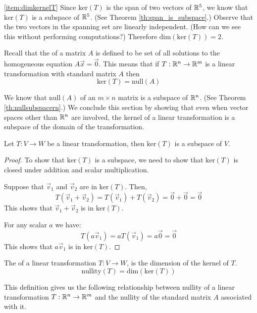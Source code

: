 \documentclass{ximera}
\begin{document}
\begin{example}
\begin{explanation}
\ref{item:dimkernelT}  Since $\mbox{ker}(T)$ is the span of two vectors of $\mathbb{R}^5$, we know that $\mbox{ker}(T)$ is a subspace of $\mathbb{R}^5$. (See Theorem \ref{th:span_is_subspace}.)  Observe that the two vectors in the spanning set are linearly independent. (How can we see this without performing computations?)  Therefore $\mbox{dim}(\mbox{ker}(T))=2$.
\end{explanation}
\end{example}
 
 
Recall that the  of a matrix $A$ is defined to be set of all solutions to the homogeneous equation $A\vec{x}=\vec{0}$. This means that  if $T:\mathbb{R}^n\rightarrow \mathbb{R}^m$ is a linear transformation with standard matrix $A$ then
$$\mbox{ker}(T)=\mbox{null}(A)$$
 
We know that $\mbox{null}(A)$ of an $m\times n$ matrix is a subspace of $\mathbb{R}^n$. (See Theorem \ref{th:nullsubspacern}.)  We conclude this section by showing that even when vector spaces other than $\mathbb{R}^n$ are involved, the kernel of a linear transformation is a subspace of the domain of the transformation.
\begin{theorem}\label{th:kersubspace} Let $T:V\rightarrow W$ be a linear transformation, then $\mbox{ker}(T)$ is a subspace of $V$.
\end{theorem}
\begin{proof}
To show that $\mbox{ker}(T)$ is a subspace, we need to show that $\mbox{ker}(T)$ is closed under addition and scalar multiplication.
 
Suppose that $\vec{v}_1$ and $\vec{v}_2$ are in $\mbox{ker}(T)$.  Then,
$$T(\vec{v}_1+\vec{v}_2)=T(\vec{v}_1)+T(\vec{v}_2)=\vec{0}+\vec{0}=\vec{0}$$
This shows that $\vec{v}_1+\vec{v}_2$ is in $\mbox{ker}(T)$.
 
For any scalar $a$ we have:
$$T(a\vec{v}_1)=aT(\vec{v}_1)=a\vec{0}=\vec{0}$$
This shows that $a\vec{v}_1$ is in $\mbox{ker}(T)$.
 
\end{proof}
 
 
 
\begin{definition}\label{def:nullityT}
The  of a linear transformation $T:V\rightarrow W$, is the dimension of the kernel of $T$.
$$\mbox{nullity}(T)=\mbox{dim}(\mbox{ker}(T))$$
\end{definition}
 
This definition gives us the following relationship between nullity of a linear transformation $T:\mathbb{R}^n\rightarrow\mathbb{R}^m$ and the nullity of the standard matrix $A$ associated with it.
 
\end{document}
